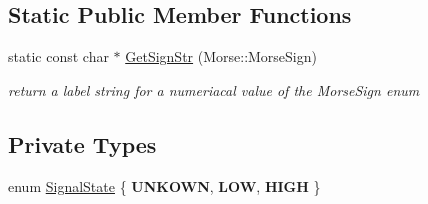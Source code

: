 \subsection*{Static Public Member Functions}
\begin{DoxyCompactItemize}
\item 
static const char $\ast$ \hyperlink{classMorseDecode_a30edafb7494cc578cf13ec8d27eebcd9}{Get\+Sign\+Str} (Morse\+::\+Morse\+Sign)
\begin{DoxyCompactList}\small\item\em return a label string for a numeriacal value of the Morse\+Sign enum \end{DoxyCompactList}\end{DoxyCompactItemize}
\subsection*{Private Types}
\begin{DoxyCompactItemize}
\item 
enum \hyperlink{classMorseDecode_abe155104534fe272d25da5eb19b317bd}{Signal\+State} \{ {\bfseries U\+N\+K\+O\+WN}, 
{\bfseries L\+OW}, 
{\bfseries H\+I\+GH}
 \}
\end{DoxyCompactItemize}
